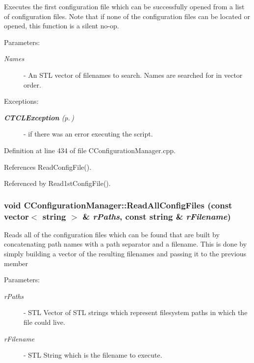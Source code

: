 Executes the first configuration file which can be successfully opened from a list of configuration files. Note that if none of the configuration files can be located or opened, this function is a silent no-op. \begin{Desc}
\item[Parameters: ]\par
\begin{description}
\item[{\em 
Names}]- An STL vector of filenames to search. Names are searched for in vector order.\end{description}
\end{Desc}
\begin{Desc}
\item[Exceptions: ]\par
\begin{description}
\item[{\em 
{\bf CTCLException} {\rm (p.\,\pageref{classCTCLException})}}] - if there was an error executing the script. \end{description}
\end{Desc}


Definition at line 434 of file CConfiguration\-Manager.cpp.

References Read\-Config\-File().

Referenced by Read1st\-Config\-File().
\subsubsection{\setlength{\rightskip}{0pt plus 5cm}void CConfiguration\-Manager::Read\-All\-Config\-Files (const vector$<$ string $>$ \& {\em r\-Paths}, const string \& {\em r\-Filename})}\label{classCConfigurationManager_a19}


Reads all of the configuration files which can be found that are built by concatenating path names with a path separator and a filename. This is done by simply building a vector of the resulting filenames and passing it to the previous member \begin{Desc}
\item[Parameters: ]\par
\begin{description}
\item[{\em 
r\-Paths}]- STL Vector of STL strings which represent filesystem paths in which the file could live. \item[{\em 
r\-Filename}]- STL String which is the filename to execute. \end{description}
\end{Desc}


